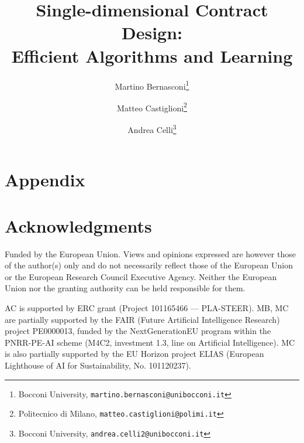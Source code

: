 \documentclass[11pt]{article}
\title{Single-dimensional Contract Design:\\ Efficient Algorithms and Learning}
\author{
    Martino Bernasconi\thanks{Bocconi University, \texttt{\textcolor{blueGrotto}{martino.bernasconi@unibocconi.it}}}\and
    Matteo Castiglioni\thanks{Politecnico di Milano, \texttt{\textcolor{blueGrotto}{matteo.castiglioni@polimi.it}}} \and
    Andrea Celli\thanks{Bocconi University, \texttt{\textcolor{blueGrotto}{andrea.celli2@unibocconi.it}}}
}
\date{}
\begin{document}
\maketitle



\clearpage
\tableofcontents
\renewcommand{\thmtformatoptarg}[1]{~#1}
\newpage
{}








\newpage
\appendix

\section*{Appendix}


\section*{Acknowledgments}

Funded by the European Union. Views and opinions expressed are however those of the author(s) only and do not necessarily reflect those of the European Union or the European Research Council Executive Agency. Neither the European Union nor the granting authority can be held responsible for them. 
%

\vspace{.5cm}
\noindent AC is supported by ERC grant (Project 101165466 — PLA-STEER). MB, MC are partially supported by the FAIR (Future Artificial Intelligence Research) project PE0000013, funded by the NextGenerationEU program within the PNRR-PE-AI scheme (M4C2, investment 1.3, line on Artificial Intelligence). MC is also partially supported by the EU Horizon project ELIAS (European Lighthouse of AI for Sustainability, No. 101120237).





\newpage
\printbibliography
\end{document}
